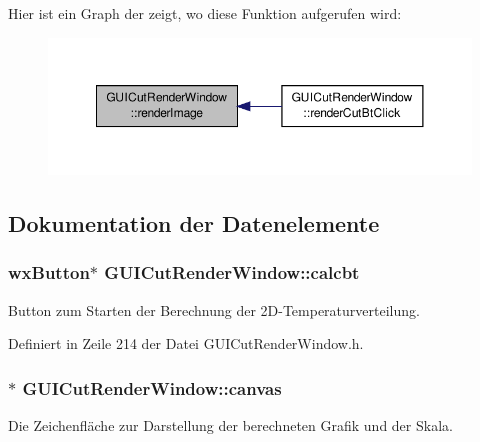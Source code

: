 Hier ist ein Graph der zeigt, wo diese Funktion aufgerufen wird\-:\nopagebreak
\begin{figure}[H]
\begin{center}
\leavevmode
\includegraphics[width=350pt]{classGUICutRenderWindow_a9eedb7088ad31f4680a77ed3a06fa60c_icgraph}
\end{center}
\end{figure}




\subsection{Dokumentation der Datenelemente}
\hypertarget{classGUICutRenderWindow_a7cadc8f5fd1b153ba21aa82fd5f70eff}{
\subsubsection[{calcbt}]{\setlength{\rightskip}{0pt plus 5cm}wx\-Button$\ast$ G\-U\-I\-Cut\-Render\-Window\-::calcbt\hspace{0.3cm}{\ttfamily [private]}}}\label{classGUICutRenderWindow_a7cadc8f5fd1b153ba21aa82fd5f70eff}
Button zum Starten der Berechnung der 2\-D-\/\-Temperaturverteilung. 

Definiert in Zeile 214 der Datei G\-U\-I\-Cut\-Render\-Window.\-h.

\hypertarget{classGUICutRenderWindow_abbaa6c66e8aa9fee96ba20a9a29e1a18}{
\subsubsection[{canvas}]{$\ast$ G\-U\-I\-Cut\-Render\-Window\-::canvas\hspace{0.3cm}{\ttfamily [private]}}}\label{classGUICutRenderWindow_abbaa6c66e8aa9fee96ba20a9a29e1a18}
Die Zeichenfläche zur Darstellung der berechneten Grafik und der Skala. 

